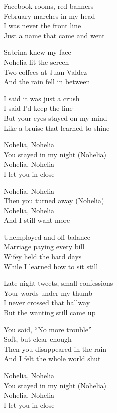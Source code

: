 \begin{lyrics}
Facebook rooms, red banners\\
February marches in my head\\
I was never the front line\\
Just a name that came and went

Sabrina knew my face\\
Nohelia lit the screen\\
Two coffees at Juan Valdez\\
And the rain fell in between

I said it was just a crush\\
I said I’d keep the line\\
But your eyes stayed on my mind\\
Like a bruise that learned to shine

Nohelia, Nohelia\\
You stayed in my night (Nohelia)\\
Nohelia, Nohelia\\
I let you in close

Nohelia, Nohelia\\
Then you turned away (Nohelia)\\
Nohelia, Nohelia\\
And I still want more

Unemployed and off balance\\
Marriage paying every bill\\
Wifey held the hard days\\
While I learned how to sit still

Late-night tweets, small confessions\\
Your words under my thumb\\
I never crossed that hallway\\
But the wanting still came up

You said, “No more trouble”\\
Soft, but clear enough\\
Then you disappeared in the rain\\
And I felt the whole world shut

Nohelia, Nohelia\\
You stayed in my night (Nohelia)\\
Nohelia, Nohelia\\
I let you in close


\end{lyrics}
